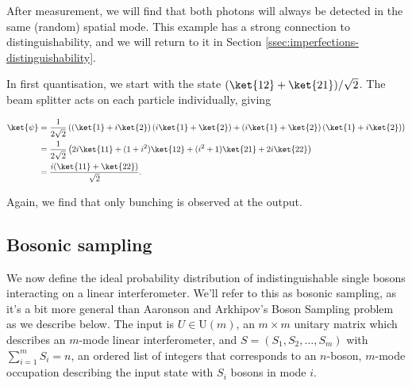 After measurement, we will find that both photons will always be detected in the same (random) spatial mode. This example has a strong connection to distinguishability, and we will return to it in Section \ref{ssec:imperfections-distinguishability}.

In first quantisation, we start with the state $(\ket{12} + \ket{21})/\sqrt{2}$. The beam splitter acts on each particle individually, giving

\begin{align}
\ket{\psi} &= \frac{1}{2\sqrt{2}}\left(\left(\ket{1} + i\ket{2}\right)\left(i\ket{1} + \ket{2}\right) + \left(i\ket{1} + \ket{2}\right)\left(\ket{1} + i\ket{2}\right)\right)\\
&= \frac{1}{2\sqrt{2}}\left(2i\ket{11} + (1+i^2)\ket{12} + (i^2+1)\ket{21} + 2i\ket{22}\right)\\
&= \frac{i(\ket{11}+\ket{22})}{\sqrt{2}}.
\end{align}

Again, we find that only bunching is observed at the output.

\subsection{Bosonic sampling}
\label{ssec:bosonic-sampling}

We now define the ideal probability distribution of indistinguishable single bosons interacting on a linear interferometer.
We'll refer to this as bosonic sampling, as it's a bit more general than Aaronson and Arkhipov's Boson Sampling problem as we describe below.
The input is $U \in \mathrm{U}(m)$, an $m\times m$ unitary matrix which describes an $m$-mode linear interferometer, and $S = (S_1,S_2,\dots,S_m)$ with $\sum_{i=1}^m S_i =n$, an ordered list of integers that corresponds to an $n$-boson, $m$-mode occupation describing the input state with $S_i$ bosons in mode $i$. 

